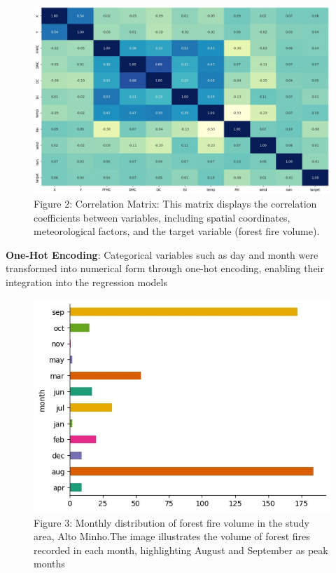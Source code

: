 \begin{figure}[ht]
    \centering
    \includegraphics[scale=0.5]{figures/Correlation Matrix.jpg}
    \caption{Figure 2: Correlation Matrix: This matrix displays the correlation coefficients between variables, including spatial coordinates, meteorological factors, and the target variable (forest fire volume). }
    \label{fig:example-01}
\end{figure}

\clearpage
\textbf{One-Hot Encoding}: Categorical variables such as day and month were transformed into numerical form through one-hot encoding, enabling their integration into the regression models

\begin{figure}[ht]
    \centering
    \includegraphics[scale=0.8]{figures/Monthly Distribution of Forest fire.jpg}
    \caption{Figure 3: Monthly distribution of forest fire volume in the study area, Alto Minho.The image illustrates the volume of forest fires recorded in each month, highlighting August and September as peak months
}
    \label{fig:example-01}
\end{figure}

